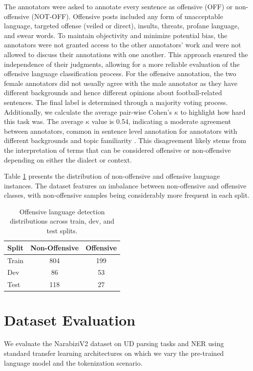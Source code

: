 \documentclass[11pt]{article}
\begin{document}
The annotators were asked to annotate every sentence as offensive (OFF) or non-offensive (NOT-OFF). Offensive posts included any form of unacceptable language, targeted offense (veiled or direct), insults, threats, profane language, and swear words.
To maintain objectivity and minimize potential bias, the annotators were not granted access to the other annotators' work and were not allowed to discuss their annotations with one another. This approach ensured the independence of their judgments, allowing for a more reliable evaluation of the offensive language classification process.
For the offensive annotation, the two female annotators did not usually agree with the male annotator as they have different backgrounds and hence different opinions about football-related sentences.
The final label is determined through a majority voting process. Additionally, we calculate the average pair-wise Cohen's $\kappa$ \cite{cohenkappa} to highlight how hard this task was. The average $\kappa$ value is 0.54, indicating a moderate agreement between  annotators, common in sentence level annotation for annotators with different backgrounds and topic familiarity \cite{bobicev-sokolova-2017-inter}.
This disagreement likely stems from the interpretation of terms that can be considered offensive or non-offensive depending on either the dialect or context.

Table \ref{tab:dataset_offensive} presents the distribution of non-offensive and offensive language instances. The dataset features an imbalance between non-offensive and offensive classes, with non-offensive samples being considerably more frequent in each split.
\begin{table}[ht]
\footnotesize
\centering
\begin{tabular}{lcc}
\toprule
Split & Non-Offensive & Offensive \\
\midrule
Train   & 804           & 199       \\
Dev     & 86            & 53        \\
Test    & 118           & 27        \\
\bottomrule
\end{tabular}
\caption{Offensive language detection distributions across train, dev, and test splits.}
\label{tab:dataset_offensive}
\end{table}

\section{Dataset Evaluation}
We evaluate the NarabiziV2 dataset on  UD parsing tasks and NER using standard transfer learning architectures on which we vary the pre-trained language model and the tokenization scenario. %
\end{document}
